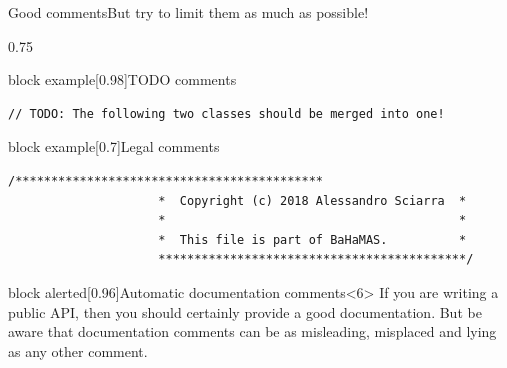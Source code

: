 \begin{frame}[fragile]{Good comments}{But try to limit them as much as possible!}
\begin{overlayarea}{\textwidth}{0.75\textheight}
\begin{onlyenv}
\begin{varblock}{block example}[0.98\textwidth]{TODO comments}
\begin{lstlisting}[style=MyCpp]
                    // TODO: The following two classes should be merged into one!
                \end{lstlisting}
            \end{varblock}
            \vspace{-2mm}
            \begin{varblock}{block example}[0.7\textwidth]{Legal comments}
                \begin{lstlisting}[style=MyCpp]
                    /*******************************************
                     *  Copyright (c) 2018 Alessandro Sciarra  *
                     *                                         *
                     *  This file is part of BaHaMAS.          *
                     *******************************************/
                \end{lstlisting}
            \end{varblock}
        \end{onlyenv}
        \vspace{-5mm}
        \begin{varblock}{block alerted}[0.96\textwidth]{Automatic documentation comments}<6>
            If you are writing a public API, then you should certainly provide a good documentation.
            But be aware that documentation comments can be as misleading, misplaced and lying as any other comment.
        \end{varblock}
    \end{overlayarea}
\end{frame}
